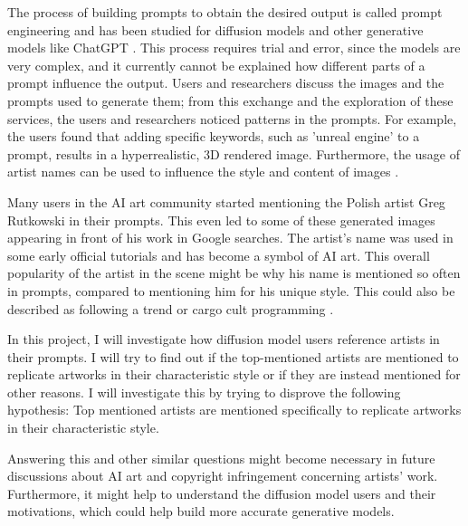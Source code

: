 The process of building prompts to obtain the desired output is called prompt engineering and has been studied for diffusion models \autocite{investigating} and other generative models like ChatGPT \autocite{chatgpt-prompt-patterns}. This process requires trial and error, since the models are very complex, and it currently cannot be explained how different parts of a prompt influence the output.
Users and researchers discuss the images and the prompts used to generate them; from this exchange and the exploration of these services, the users and researchers \autocite{design-guidelines} noticed patterns in the prompts. For example, the users found that adding specific keywords, such as 'unreal engine' to a prompt, results in a hyperrealistic, 3D rendered image. Furthermore, the usage of artist names can be used to influence the style and content of images \autocite{investigating}.


Many users in the AI art community started mentioning the Polish artist Greg Rutkowski in their prompts. This even led to some of these generated images appearing in front of his work in Google searches. The artist's name was used in some early official tutorials \autocite{dominating} and has become a symbol of AI art. This overall popularity of the artist in the scene might be why his name is mentioned so often in prompts, compared to mentioning him for his unique style. This could also be described as following a trend or cargo cult programming \autocite{ccp}.


In this project, I will investigate how diffusion model users reference artists in their prompts.
I will try to find out if the top-mentioned artists are mentioned to replicate artworks in their characteristic style or if they are instead mentioned for other reasons.
I will investigate this by trying to disprove the following hypothesis:
Top mentioned artists are mentioned specifically to replicate artworks in their characteristic style.


Answering this and other similar questions might become necessary in future discussions about AI art and copyright infringement concerning artists' work. Furthermore, it might help to understand the diffusion model users and their motivations, which could help build more accurate generative models.







